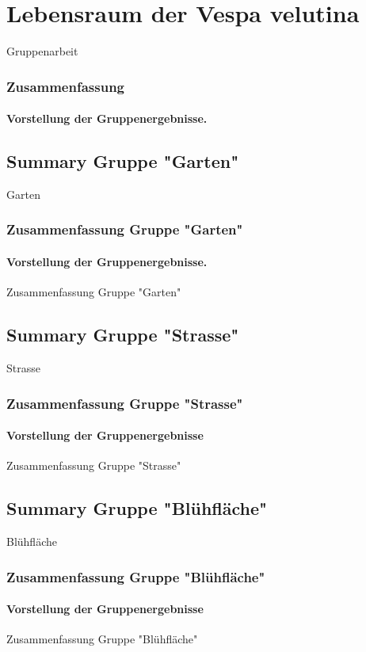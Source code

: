 \documentclass[aspectratio=169]{beamer}
\begin{document}

\section{Lebensraum der Vespa velutina}


\begin{frame}{Gruppenarbeit}
\frametitle{Zusammenfassung} 
\framesubtitle{Vorstellung der Gruppenergebnisse.}
\end{frame}
\subsection[Garten]{Summary Gruppe "Garten"}


\begin{frame}{Garten}
	\frametitle{Zusammenfassung Gruppe "Garten"} 
	\framesubtitle{Vorstellung der Gruppenergebnisse.}
	Zusammenfassung Gruppe "Garten"
\end{frame}

\subsection[Strasse]{Summary Gruppe "Strasse"}

\begin{frame}{Strasse}
\frametitle{Zusammenfassung Gruppe "Strasse"} 
\framesubtitle{Vorstellung der Gruppenergebnisse}
Zusammenfassung Gruppe "Strasse"
\end{frame}

\subsection[Blühfläche]{Summary Gruppe "Blühfläche"}

\begin{frame}{Blühfläche}
\frametitle{Zusammenfassung Gruppe "Blühfläche"} 
\framesubtitle{Vorstellung der Gruppenergebnisse}
Zusammenfassung Gruppe "Blühfläche"
\end{frame}
\end{document}
